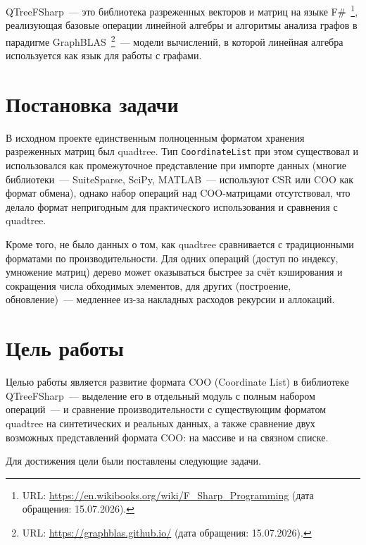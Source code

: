 \documentclass[a4paper]{article}
\begin{document}
QTreeFSharp~--- это библиотека разреженных векторов и матриц на языке F\#~\footnote{URL: \url{https://en.wikibooks.org/wiki/F_Sharp_Programming} (дата обращения: 15.07.2026).}, реализующая базовые операции линейной алгебры и алгоритмы анализа графов в парадигме GraphBLAS~\footnote{URL: \url{https://graphblas.github.io/} (дата обращения: 15.07.2026). }~--- модели вычислений, в которой линейная алгебра используется как язык для работы с графами.

\section{Постановка задачи}

В исходном проекте единственным полноценным форматом хранения разреженных матриц был quadtree. Тип \texttt{CoordinateList} при этом существовал и использовался как промежуточное представление при импорте данных (многие библиотеки~--- SuiteSparse, SciPy, MATLAB~--- используют CSR или COO как формат обмена), однако набор операций над COO-матрицами отсутствовал, что делало формат непригодным для практического использования и сравнения с quadtree.

Кроме того, не было данных о том, как quadtree сравнивается с традиционными форматами по производительности. Для одних операций (доступ по индексу, умножение матриц) дерево может оказываться быстрее за счёт кэширования и сокращения числа обходимых элементов, для других (построение, обновление)~--- медленнее из-за накладных расходов рекурсии и аллокаций.

\section{Цель работы}

Целью работы является развитие формата COO (Coordinate List) в библиотеке QTreeFSharp~--- выделение его в отдельный модуль с полным набором операций~--- и сравнение производительности с существующим форматом quadtree на синтетических и реальных данных, а также сравнение двух возможных представлений формата COO: на массиве и на связном списке.

Для достижения цели были поставлены следующие задачи.
\end{document}
